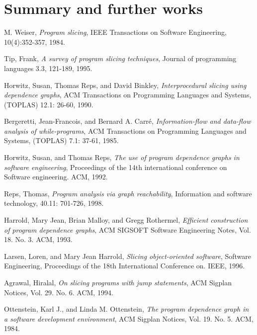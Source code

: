 \documentclass[oneside,12pt,a4paper]{book}
\begin{document}
\section{Summary and further works}




\begin{thebibliography}{Textttext}
  M. Weiser,
  \emph{Program slicing},
  IEEE Transactions on Software Engineering,
  10(4):352-357,
  1984.

  Tip, Frank,
  \emph{A survey of program slicing techniques},
  Journal of programming languages 3.3,
  121-189,
  1995. 

  Horwitz, Susan, Thomas Reps, and David Binkley,
  \emph{Interprocedural slicing using dependence graphs}, 
  ACM Transactions on Programming Languages and Systems,
  (TOPLAS) 12.1: 26-60,
  1990.

  Bergeretti, Jean-Francois, and Bernard A. Carré,
  \emph{Information-flow and data-flow analysis of while-programs},
  ACM Transactions on Programming Languages and Systems,
  (TOPLAS) 7.1: 37-61,
  1985.

  Horwitz, Susan, and Thomas Reps,
  \emph{The use of program dependence graphs in software engineering},
  Proceedings of the 14th international conference on Software engineering. 
  ACM,
  1992.

  Reps, Thomas,
  \emph{Program analysis via graph reachability},
  Information and software technology,
  40.11: 701-726,
  1998.

  Harrold, Mary Jean, Brian Malloy, and Gregg Rothermel,
  \emph{Efficient construction of program dependence graphs},
  ACM SIGSOFT Software Engineering Notes,
  Vol. 18. No. 3. ACM,
  1993.

  Larsen, Loren, and Mary Jean Harrold,
  \emph{Slicing object-oriented software},
  Software Engineering,
  Proceedings of the 18th International Conference on. IEEE,
  1996.

  Agrawal, Hiralal,
  \emph{On slicing programs with jump statements},
  ACM Sigplan Notices,
  Vol. 29. No. 6. ACM,
  1994.

  Ottenstein, Karl J., and Linda M. Ottenstein,
  \emph{The program dependence graph in a software development environment},
  ACM Sigplan Notices,
  Vol. 19. No. 5. ACM,
  1984.
  

\end{thebibliography}
\end{document}
